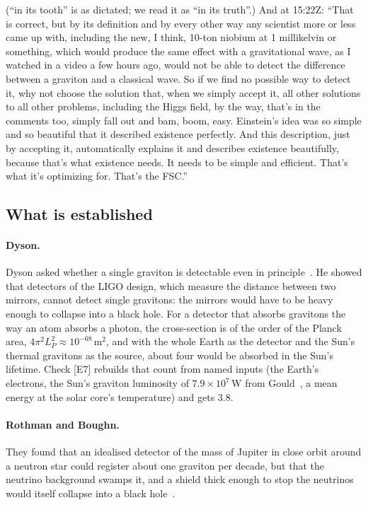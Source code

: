 \documentclass[11pt,a4paper]{article}
\theoremstyle{definition}
\theoremstyle{remark}
\newcommand{\chk}[1]{\textsf{[#1]}}
\begin{document}
\noindent (``in its tooth'' is as dictated; we read it as ``in its truth''.) And at 15:22Z: ``That is correct, but by its definition and by
every other way any scientist more or less came up with, including the new, I think, 10-ton niobium at 1 millikelvin or something, which
would produce the same effect with a gravitational wave, as I watched in a video a few hours ago, would not be able to detect the
difference between a graviton and a classical wave. So if we find no possible way to detect it, why not choose the solution that, when we
simply accept it, all other solutions to all other problems, including the Higgs field, by the way, that's in the comments too, simply
fall out and bam, boom, easy. Einstein's idea was so simple and so beautiful that it described existence perfectly. And this description,
just by accepting it, automatically explains it and describes existence beautifully, because that's what existence needs. It needs to be
simple and efficient. That's what it's optimizing for. That's the FSC.''

\subsection{What is established}

\paragraph{Dyson.} Dyson asked whether a single graviton is detectable even in principle~\cite{dyson}. He showed that detectors of the
LIGO design, which measure the distance between two mirrors, cannot detect single gravitons: the mirrors would have to be heavy enough to
collapse into a black hole. For a detector that absorbs gravitons the way an atom absorbs a photon, the cross-section is of the order of
the Planck area, $4\pi^2L_P^2\approx10^{-68}$\,m$^2$, and with the whole Earth as the detector and the Sun's thermal gravitons as the
source, about four would be absorbed in the Sun's lifetime. Check \chk{E7} rebuilds that count from named inputs (the Earth's electrons,
the Sun's graviton luminosity of $7.9\times10^{7}$\,W from Gould~\cite{gould}, a mean energy at the solar core's temperature) and gets
$3.8$.

\paragraph{Rothman and Boughn.} They found that an idealised detector of the mass of Jupiter in close orbit around a neutron star could
register about one graviton per decade, but that the neutrino background swamps it, and a shield thick enough to stop the neutrinos
would itself collapse into a black hole~\cite{rb}.
\end{document}
